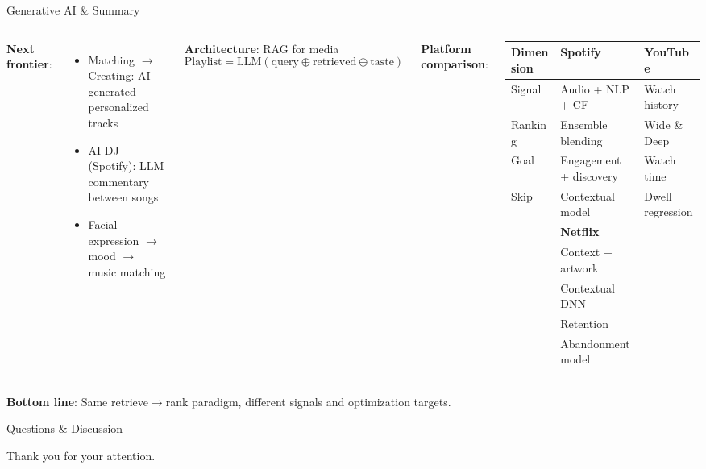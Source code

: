\documentclass[aspectratio=169, 11pt]{beamer}
\begin{document}
\begin{frame}{Generative AI \& Summary}
\small
\begin{columns}[T]
\textbf{Next frontier}:
\begin{itemize}
    \item Matching $\to$ Creating: AI-generated personalized tracks
    \item AI DJ (Spotify): LLM commentary between songs
    \item Facial expression $\to$ mood $\to$ music matching
\end{itemize}

\vspace{0.15cm}
\textbf{Architecture}: RAG for media
\begin{equation*}
\text{Playlist} = \text{LLM}(\text{query} \oplus \text{retrieved} \oplus \text{taste})
\end{equation*}

\textbf{Platform comparison}:
\begin{table}
\centering
\small
\begin{tabular}{lll}
\toprule
\textbf{Dimension} & \textbf{Spotify} & \textbf{YouTube} \\
\midrule
Signal & Audio + NLP + CF & Watch history \\
Ranking & Ensemble blending & Wide \& Deep \\
Goal & Engagement + discovery & Watch time \\
Skip & Contextual model & Dwell regression \\
\midrule
& \textbf{Netflix} & \\
& Context + artwork & \\
& Contextual DNN & \\
& Retention & \\
& Abandonment model & \\
\bottomrule
\end{tabular}
\end{table}
\end{columns}

\vspace{0.1cm}
\centering
\textbf{Bottom line}: Same retrieve$\to$rank paradigm, different signals and optimization targets.
\end{frame}

\begin{frame}
\centering
\Huge Questions \& Discussion

\vspace{0.5cm}
\normalsize
Thank you for your attention.
\end{frame}
\end{document}
